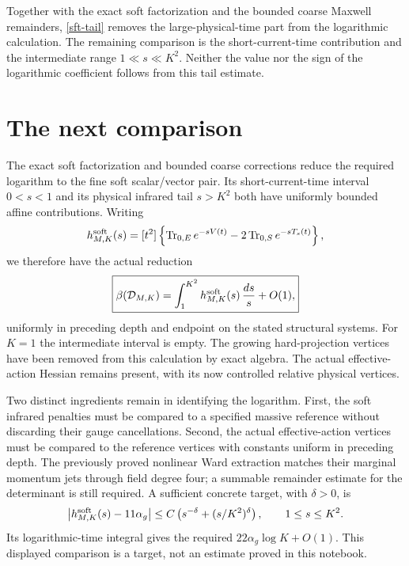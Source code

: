 \documentclass[11pt]{article}
\theoremstyle{remark}
\begin{document}
Together with the exact soft factorization and the bounded coarse
Maxwell remainders, \eqref{sft-tail} removes the large-physical-time
part from the logarithmic calculation. The remaining comparison is
the short-current-time contribution and the intermediate range
\(1\ll s\ll K^2\). Neither the value nor the sign of the logarithmic
coefficient follows from this tail estimate.


\section{The next comparison}

The exact soft factorization and bounded coarse corrections reduce
the required logarithm to the fine soft scalar/vector pair. Its
short-current-time interval \(0<s<1\) and its physical infrared
tail \(s>K^2\) both have uniformly bounded affine contributions.
Writing
\[
 h^{\rm soft}_{M,K}(s)=[t^2]\left\{
   \operatorname{Tr}_{0,E}e^{-sV(t)}
       -2\operatorname{Tr}_{0,S}e^{-sT_s(t)}\right\},
\]
we therefore have the actual reduction
\begin{equation}
 \boxed{\displaystyle
 \beta(\mathcal D_{M,K})
       =\int_1^{K^2}h^{\rm soft}_{M,K}(s)\,\frac{ds}{s}+O(1),}
 \label{soft-final-band-reduction}
\end{equation}
uniformly in preceding depth and endpoint on the stated structural
systems. For \(K=1\) the intermediate interval is empty. The
growing hard-projection vertices have been removed from this
calculation by exact algebra. The actual effective-action Hessian
remains present, with its now controlled relative physical vertices.

Two distinct ingredients remain in identifying the logarithm.
First, the soft infrared penalties must be compared to a specified
massive reference without discarding their gauge cancellations.
Second, the actual effective-action vertices must be compared to
the reference vertices with constants uniform in preceding depth.
The previously proved nonlinear Ward extraction matches their
marginal momentum jets through field degree four; a summable
remainder estimate for the determinant is still required.
A sufficient concrete target, with \(\delta>0\), is
\[
 \left|h^{\rm soft}_{M,K}(s)-11\alpha_g\right|
       \le C\left(s^{-\delta}+(s/K^2)^\delta\right),
       \qquad 1\le s\le K^2.
\]
Its logarithmic-time integral gives the required
\(22\alpha_g\log K+O(1)\). This displayed comparison is a target,
not an estimate proved in this notebook.
\end{document}
